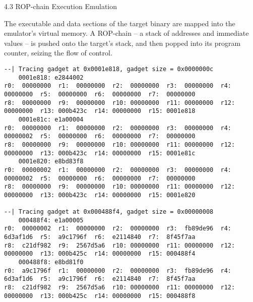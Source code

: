 \documentclass[9pt]{beamer}
\begin{document}
\begin{frame}[fragile]{4.3 ROP-chain Execution Emulation}

The executable and data sections of the target
binary are mapped into the emulator's virtual
memory. A ROP-chain -- a stack of addresses and
immediate values -- is pushed onto the target's
stack, and then popped into its program counter,
seizing the flow of control.

\tiny
\begin{verbatim}
--| Tracing gadget at 0x0001e818, gadget size = 0x0000000c
    0001e818: e2844002
r0:  00000000  r1:  00000000  r2:  00000000  r3:  00000000  r4:  00000000  r5:  00000000  r6:  00000000  r7:  00000000
r8:  00000000  r9:  00000000  r10: 00000000  r11: 00000000  r12: 00000000  r13: 000b423c  r14: 00000000  r15: 0001e818
    0001e81c: e1a00004
r0:  00000000  r1:  00000000  r2:  00000000  r3:  00000000  r4:  00000002  r5:  00000000  r6:  00000000  r7:  00000000
r8:  00000000  r9:  00000000  r10: 00000000  r11: 00000000  r12: 00000000  r13: 000b423c  r14: 00000000  r15: 0001e81c
    0001e820: e8bd83f8
r0:  00000002  r1:  00000000  r2:  00000000  r3:  00000000  r4:  00000002  r5:  00000000  r6:  00000000  r7:  00000000
r8:  00000000  r9:  00000000  r10: 00000000  r11: 00000000  r12: 00000000  r13: 000b423c  r14: 00000000  r15: 0001e820

--| Tracing gadget at 0x000488f4, gadget size = 0x00000008
    000488f4: e1a00005
r0:  00000002  r1:  00000000  r2:  00000000  r3:  fb89de96  r4:  6d3af1d6  r5:  a9c1796f  r6:  e2114840  r7:  8f45f7aa
r8:  c21df982  r9:  2567d5a6  r10: 00000000  r11: 00000000  r12: 00000000  r13: 000b425c  r14: 00000000  r15: 000488f4
    000488f8: e8bd81f0
r0:  a9c1796f  r1:  00000000  r2:  00000000  r3:  fb89de96  r4:  6d3af1d6  r5:  a9c1796f  r6:  e2114840  r7:  8f45f7aa
r8:  c21df982  r9:  2567d5a6  r10: 00000000  r11: 00000000  r12: 00000000  r13: 000b425c  r14: 00000000  r15: 000488f8
\end{verbatim}
\end{frame}
\end{document}
